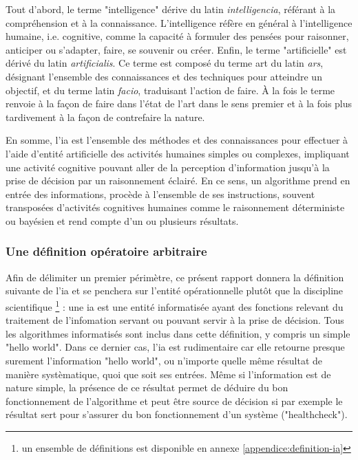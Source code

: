 Tout d'abord, le terme "intelligence" dérive du latin \textit{intelligencia}, référant à la compréhension et à la connaissance. L'intelligence réfère en général à l'intelligence humaine, i.e. cognitive, comme la capacité à formuler des pensées pour raisonner, anticiper ou s'adapter, faire, se souvenir ou créer.
Enfin, le terme "artificielle" est dérivé du latin \textit{artificialis}. Ce terme est composé du terme art du latin \textit{ars}, désignant l'ensemble des connaissances et des techniques pour atteindre un objectif, et du terme latin \textit{facio}, traduisant l'action de faire. À la fois le terme renvoie à la façon de faire dans l'état de l'art dans le sens premier et à la fois plus tardivement à la façon de contrefaire la nature.

En somme, l'\gls{ia} est l'ensemble des méthodes et des connaissances pour effectuer à l'aide d'entité artificielle des activités humaines simples ou complexes, impliquant une activité cognitive pouvant aller de la perception d'information jusqu'à la prise de décision par un raisonnement éclairé. En ce sens, un algorithme prend en entrée des informations, procède à l'ensemble de ses instructions, souvent transposées d'activités cognitives humaines comme le raisonnement déterministe ou bayésien et rend compte d'un ou plusieurs résultats.

\subsubsection{Une définition opératoire arbitraire}
Afin de délimiter un premier périmètre, ce présent rapport donnera la définition suivante de l'\gls{ia} et se penchera sur l'entité opérationnelle plutôt que la discipline scientifique \footnote{un ensemble de définitions est disponible en annexe \ref{appendice:definition-ia}} : une \gls{ia} est une entité informatisée ayant des fonctions relevant du traitement de l'infomation servant ou pouvant servir à la prise de décision. Tous les algorithmes informatisés sont inclus dans cette définition, y compris un simple "hello world". Dans ce dernier cas, l'\gls{ia} est rudimentaire car elle retourne presque surement l'information "hello world", ou n'importe quelle même résultat de manière systèmatique, quoi que soit ses entrées. Même si l'information est de nature simple, la présence de ce résultat permet de déduire du bon fonctionnement de l'algorithme et peut être source de décision si par exemple le résultat sert pour s'assurer du bon fonctionnement d'un système ("healthcheck").

